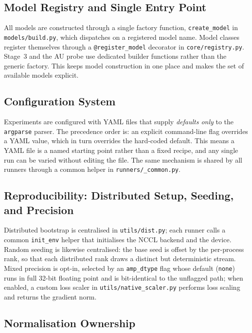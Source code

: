 \subsection{Model Registry and Single Entry Point}
\label{sec:impl-design-registry}

All models are constructed through a single factory function, \texttt{create\_model} in
\texttt{models/build.py}, which dispatches on a registered model name. Model classes
register themselves through a \texttt{@register\_model} decorator in
\texttt{core/registry.py}. Stage~3 and the AU probe use dedicated builder functions rather
than the generic factory. This keeps model construction in one place and makes the set of
available models explicit.

\subsection{Configuration System}
\label{sec:impl-design-config}

Experiments are configured with YAML files that supply \emph{defaults only} to the
\texttt{argparse} parser. The precedence order is: an explicit command-line flag overrides
a YAML value, which in turn overrides the hard-coded default. This means a YAML file is a
named starting point rather than a fixed recipe, and any single run can be varied without
editing the file. The same mechanism is shared by all runners through a common helper in
\texttt{runners/\_common.py}.

\subsection{Reproducibility: Distributed Setup, Seeding, and Precision}
\label{sec:impl-design-repro}

Distributed bootstrap is centralised in \texttt{utils/dist.py}; each runner calls a common
\texttt{init\_env} helper that initialises the NCCL backend and the device. Random seeding
is likewise centralised: the base seed is offset by the per-process rank, so that each
distributed rank draws a distinct but deterministic stream. Mixed precision is opt-in,
selected by an \texttt{amp\_dtype} flag whose default (\texttt{none}) runs in full
32-bit floating point and is bit-identical to the unflagged path; when enabled, a custom
loss scaler in \texttt{utils/native\_scaler.py} performs loss scaling and returns the
gradient norm.

\subsection{Normalisation Ownership}
\label{sec:impl-design-norm}

